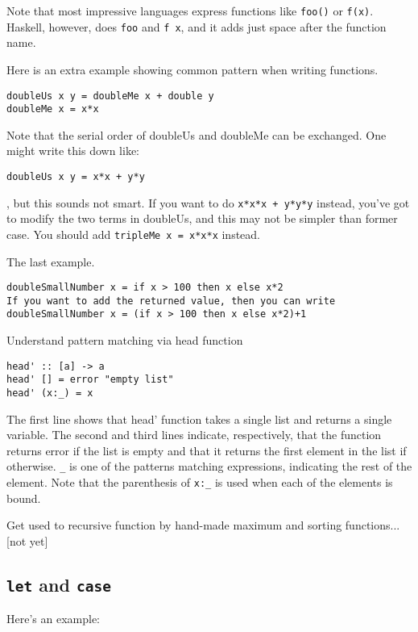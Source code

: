 Note that most impressive languages express functions like \lstinline{foo()} or \lstinline{f(x)}. Haskell, however, does \lstinline{foo} and \lstinline{f x}, and it adds just space after the function name.

Here is an extra example showing common pattern when writing functions. 
\begin{lstlisting}
doubleUs x y = doubleMe x + double y
doubleMe x = x*x 
\end{lstlisting}

Note that the serial order of doubleUs and doubleMe can be exchanged.
One might write this down like:
\begin{lstlisting}
doubleUs x y = x*x + y*y
\end{lstlisting}

, but this sounds not smart. If you want to do \lstinline{x*x*x + y*y*y} instead, you’ve got to modify the two terms in doubleUs, and this may not be simpler than former case. You should add \lstinline{tripleMe x = x*x*x} instead.

The last example.
\begin{lstlisting}
doubleSmallNumber x = if x > 100 then x else x*2
If you want to add the returned value, then you can write
doubleSmallNumber x = (if x > 100 then x else x*2)+1
\end{lstlisting}

Understand pattern matching via head function

\begin{lstlisting}
head' :: [a] -> a
head' [] = error "empty list"
head' (x:_) = x
\end{lstlisting}

The first line shows that head' function takes a single list and returns a single variable. 
The second and third lines indicate, respectively, 
that the function returns error if the list is empty and that it returns the first element in the list if otherwise. 
\lstinline{_} is one of the patterns matching expressions, indicating the rest of the element. 
Note that the parenthesis of \lstinline{x:_} is used when each of the elements is bound.

Get used to recursive function by hand-made maximum and sorting functions...[not yet]

\subsection{\lstinline{let} and \lstinline{case}}
Here’s an example:

